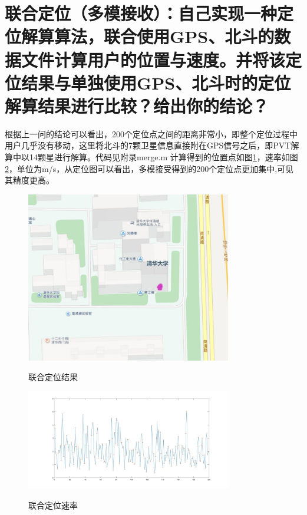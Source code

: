 \section{	联合定位（多模接收）：自己实现一种定位解算算法，联合使用GPS、北斗的数据文件计算用户的位置与速度。并将该定位结果与单独使用GPS、北斗时的定位解算结果进行比较？给出你的结论？}
根据上一问的结论可以看出，200个定位点之间的距离非常小，即整个定位过程中用户几乎没有移动，这里将北斗的7颗卫星信息直接附在GPS信号之后，即PVT解算中以14颗星进行解算。代码见附录merge.m
    计算得到的位置点如图\ref{merge}，速率如图\ref{v_merge}，单位为m/s，从定位图可以看出，多模接受得到的200个定位点更加集中,可见其精度更高。
\begin{figure}
    \centering
    \includegraphics[width=0.8\textwidth]{pic/merge.jpg}\\
    \caption{联合定位结果}
    \label{merge}
\end{figure}
\begin{figure}
    \centering
    \includegraphics[width=0.8\textwidth]{pic/v_merge.jpg}\\
    \caption{联合定位速率}
    \label{v_merge}
\end{figure}

